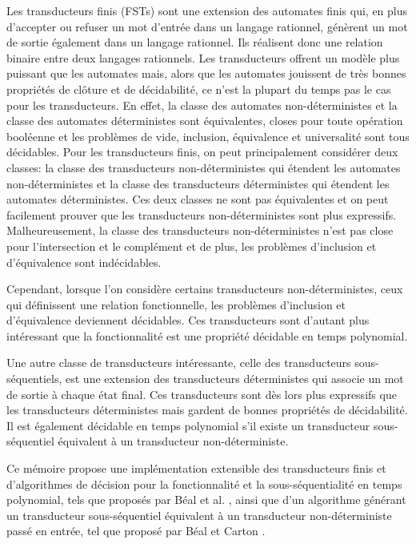 
Les transducteurs finis (FSTs) sont une extension des automates finis qui, en plus d'accepter ou refuser un mot d'entrée dans un langage rationnel, génèrent un mot de sortie également dans un langage rationnel. Ils réalisent donc une relation binaire entre deux langages rationnels. Les transducteurs offrent un modèle plus puissant que les automates mais, alors que les automates jouissent de très bonnes propriétés de clôture et de décidabilité, ce n'est la plupart du temps pas le cas pour les transducteurs. En effet, la classe des automates non-déterministes et la classe des automates déterministes sont équivalentes, closes pour toute opération booléenne et les problèmes de vide, inclusion, équivalence et universalité sont tous décidables. Pour les transducteurs finis, on peut principalement considérer deux classes: la classe des transducteurs non-déterministes qui étendent les automates non-déterministes et la classe des transducteurs déterministes qui étendent les automates déterministes. Ces deux classes ne sont pas équivalentes et on peut facilement prouver que les transducteurs non-déterministes sont plus expressifs. Malheureusement, la classe des transducteurs non-déterministes n'est pas close pour l'intersection et le complément et de plus, les problèmes d'inclusion et d'équivalence sont indécidables.

Cependant, lorsque l'on considère certains transducteurs non-déterministes, ceux qui définissent une relation fonctionnelle, les problèmes d'inclusion et d'équivalence deviennent décidables. Ces transducteurs sont d'autant plus intéressant que la fonctionnalité est une propriété décidable en temps polynomial.

Une autre classe de transducteurs intéressante, celle des transducteurs sous-séquentiels, est une extension des transducteurs déterministes qui associe un mot de sortie à chaque état final. Ces transducteurs sont dès lors plus expressifs que les transducteurs déterministes mais gardent de bonnes propriétés de décidabilité. Il est également décidable en temps polynomial s'il existe un transducteur sous-séquentiel équivalent à un transducteur non-déterministe.

Ce mémoire propose une implémentation extensible des transducteurs finis et d'algorithmes de décision pour la fonctionnalité et la sous-séquentialité en temps polynomial, tels que proposés par Béal et al. \cite{Bea03}, ainsi que d'un algorithme générant un transducteur sous-séquentiel équivalent à un transducteur non-déterministe passé en entrée, tel que proposé par Béal et Carton \cite{Bea02}.

